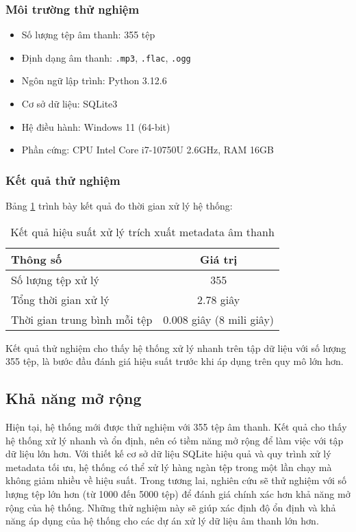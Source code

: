 \documentclass[conference]{IEEEtran}
\begin{document}
\subsubsection{Môi trường thử nghiệm}

\begin{itemize}
    \item Số lượng tệp âm thanh: 355 tệp
    \item Định dạng âm thanh: \texttt{.mp3}, \texttt{.flac}, \texttt{.ogg}
    \item Ngôn ngữ lập trình: Python 3.12.6
    \item Cơ sở dữ liệu: SQLite3
    \item Hệ điều hành: Windows 11 (64-bit)
    \item Phần cứng: CPU Intel Core i7-10750U 2.6GHz, RAM 16GB
\end{itemize}

\subsubsection{Kết quả thử nghiệm}

Bảng \ref{tab:performance} trình bày kết quả đo thời gian xử lý hệ thống:

\begin{table}[H]
    \centering
    \caption{Kết quả hiệu suất xử lý trích xuất metadata âm thanh}
    \begin{tabular}{|l|c|}
    \hline
    \textbf{Thông số} & \textbf{Giá trị} \\
    \hline
    Số lượng tệp xử lý & 355 \\
    Tổng thời gian xử lý & 2.78 giây \\
    Thời gian trung bình mỗi tệp & 0.008 giây (8 mili giây) \\
    \hline
    \end{tabular}
    \label{tab:performance}
\end{table}

Kết quả thử nghiệm cho thấy hệ thống xử lý nhanh trên tập dữ liệu với số lượng 355 tệp, là bước đầu đánh giá hiệu suất trước khi áp dụng trên quy mô lớn hơn.

\subsection{Khả năng mở rộng}

Hiện tại, hệ thống mới được thử nghiệm với 355 tệp âm thanh. Kết quả cho thấy hệ thống xử lý nhanh và ổn định, nên có tiềm năng mở rộng để làm việc với tập dữ liệu lớn hơn.
Với thiết kế cơ sở dữ liệu SQLite hiệu quả và quy trình xử lý metadata tối ưu, hệ thống có thể xử lý hàng ngàn tệp trong một lần chạy mà không giảm nhiều về hiệu suất.
Trong tương lai, nghiên cứu sẽ thử nghiệm với số lượng tệp lớn hơn (từ 1000 đến 5000 tệp) để đánh giá chính xác hơn khả năng mở rộng của hệ thống.
Những thử nghiệm này sẽ giúp xác định độ ổn định và khả năng áp dụng của hệ thống cho các dự án xử lý dữ liệu âm thanh lớn hơn.
\end{document}
